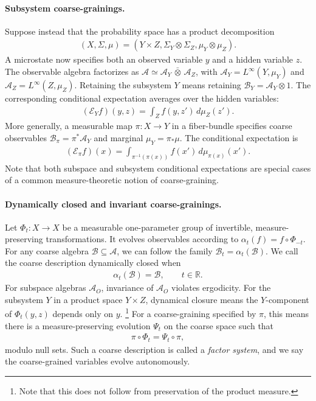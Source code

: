 \documentclass[a4paper,11pt]{article}
\theoremstyle{definition}
\theoremstyle{remark}
\newcommand{\mA}{\mathcal{A}}
\newcommand{\mB}{\mathcal{B}}
\begin{document}
\paragraph{Subsystem coarse-grainings.}
Suppose instead that the probability space has a product decomposition
\begin{align}
    (X,\Sigma,\mu)=(Y\times Z,\Sigma_Y\otimes\Sigma_Z,\mu_Y\otimes\mu_Z).
\end{align}
A microstate now specifies both an observed variable $y$ and a hidden variable $z$.
The observable algebra factorizes as
$\mA\simeq\mA_Y\,\bar\otimes\,\mA_Z$, with
$\mA_Y=L^\infty(Y,\mu_Y)$ and $\mA_Z=L^\infty(Z,\mu_Z)$.  Retaining the subsystem
$Y$ means retaining $\mB_Y=\mA_Y\otimes 1$.  The corresponding conditional expectation
averages over the hidden variables:
\begin{align}
    (\mathcal{E}_Y f)(y,z)=\int_Z f(y,z')\,d\mu_Z(z').
\end{align}
More generally, a measurable map $\pi:X\to Y$ in a fiber-bundle specifies coarse
observables $\mB_\pi=\pi^*\mA_Y$ and marginal $\mu_Y=\pi_*\mu$.  The conditional
expectation is
\begin{align}
    (\mathcal{E}_\pi f)(x)=\int_{\pi^{-1}(\pi(x))}f(x')\,d\mu_{\pi(x)}(x').
\end{align}
Note that both subspace and subsystem conditional expectations are special cases of a
common measure-theoretic notion of coarse-graining.
 
\paragraph{Dynamically closed and invariant coarse-grainings.}
Let $\Phi_t:X\to X$ be a measurable one-parameter group of invertible,
measure-preserving transformations.  It evolves observables according to
$\alpha_t(f)=f\circ\Phi_{-t}$.  For any coarse algebra $\mB\subseteq\mA$, we can
follow the family $\mB_t=\alpha_t(\mB)$.  We call the coarse description dynamically
closed when
\begin{align}\label{eq:classical-coarse-invariance}
    \alpha_t(\mB)=\mB,\qquad t\in\mathbb{R}.
\end{align}
For subspace algebras $\mA_O$, invariance of $\mA_O$ violates ergodicity.  For the
subsystem $Y$ in a product space $Y\times Z$, dynamical closure means the $Y$-component
of $\Phi_t(y,z)$ depends only on $y$.%
\footnote{Note that this does not follow from preservation of the product measure.}
For a coarse-graining specified by $\pi$, this means there is a measure-preserving
evolution $\Psi_t$ on the coarse space such that
\begin{align}\label{eq:classical-factor-intertwining}
    \pi\circ\Phi_t=\Psi_t\circ\pi,
\end{align}
modulo null sets.  Such a coarse description is called a \emph{factor system}, and we
say the coarse-grained variables evolve autonomously.
 
\end{document}
